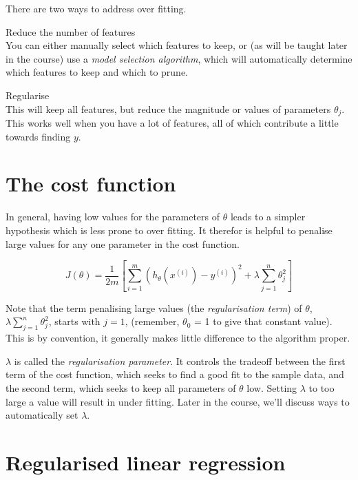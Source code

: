 There are two ways to address over fitting.
\begin{description}
\item{Reduce the number of features} \hfill\\ You can either manually select which features to keep, or (as will be taught later in the course) use a \emph{model selection algorithm}, which will automatically determine which features to keep and which to prune.
\item{Regularise} \hfill\\ This will keep all features, but reduce the magnitude or values of parameters $\theta_j$. This works well when you have a lot of features, all of which contribute a little towards finding $y$.
\end{description}

\section{The cost function}

In general, having low values for the parameters of $\theta$ leads to a simpler hypothesis which is less prone to over fitting. It therefor is helpful to penalise large values for any one parameter in the cost function.

\begin{equation}
J(\theta) = \frac{1}{2m}[\sum^m_{i = 1}
(h_\theta(x^{(i)}) - y^{(i)})^2 +
\lambda \sum^n_{j = 1}\theta^2_j]
\end{equation}

Note that the term penalising large values (the \emph{regularisation term}) of $\theta$, $\lambda \sum^n_{j = 1}\theta^2_j$, starts with $ j = 1 $, (remember, $\theta_0$ = 1 to give that constant value). This is by convention, it generally makes little difference to the algorithm proper.

$\lambda$ is called the \emph{regularisation parameter}. It controls the tradeoff between the first term of the cost function, which seeks to find a good fit to the sample data, and the second term, which seeks to keep all parameters of $\theta$ low. Setting $\lambda$ to too large a value will result in under fitting. Later in the course, we'll discuss ways to automatically set $\lambda$.

\section{Regularised linear regression}

